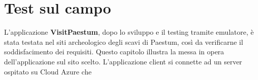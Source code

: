 
\chapter{Test sul campo}
\label{ref:test}

L'applicazione \textbf{VisitPaestum}, dopo lo sviluppo e il testing tramite emulatore, è stata testata nel siti archeologico degli scavi di Paestum, così da verificarne il soddisfacimento dei requisiti.
Questo capitolo illustra la messa in opera dell'applicazione sul sito scelto.
L'applicazione client si connette ad un server ospitato su Cloud Azure che

